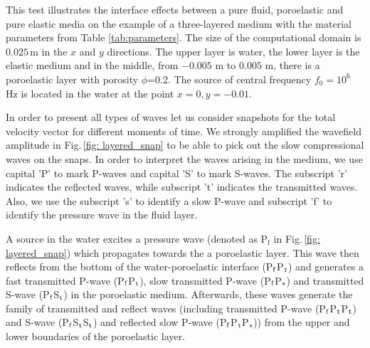 \documentclass[3p,times,table]{article}
\begin{document}
This test illustrates the interface effects between a pure fluid, poroelastic 
and 
pure elastic media on the example of a three-layered medium with the material 
parameters from Table 
\ref{tab:parameters}. The size of the computational domain is $0.025$\,m in the 
$ x $ and $ y $ directions. The upper layer is water, the lower layer is the
elastic 
medium and in the middle, from $-0.005$ m to $0.005$ m, there is a poroelastic 
layer with porosity $\phi$=0.2. The source of central frequency $f_0=10^{6}$ Hz 
is located in the water at the point $x=0, y=-0.01$. 

In order to present all types of waves let us consider snapshots  for the total 
velocity vector  for different moments of time. We strongly amplified the 
wavefield amplitude in Fig.\,\ref{fig: layered_snap} to be able to pick out the 
slow compressional waves on the snaps. In order to interpret the waves arising 
in the medium, we use capital 'P' to mark P-waves  and capital 'S' to 
mark S-waves. The subscript 'r'  indicates the reflected waves, while 
subscript 't'  indicates the transmitted waves. Also, we use the 
subscript 's' to identify a slow P-wave and subscript 'f' to identify the 
pressure wave in the fluid layer.

A source in the water excites a pressure wave (denoted as P$_\textrm{f}$ in 
Fig.\,\ref{fig: 
layered_snap}) which propagates towards the a poroelastic layer.
This wave then reflects from the bottom of the water-poroelastic interface 
(P$_\textrm f$P$_\textrm r$) and generates a fast transmitted P-wave 
(P$_\textrm f$P$_\textrm t$),  slow 
transmitted P-wave (P$_\textrm f$P$_\textrm s$) and transmitted 
S-wave (P$_\textrm f$S$_\textrm t$) in the  poroelastic medium. Afterwards, 
these waves generate the 
family of transmitted and reflect waves (including transmitted P-wave 
(P$_\textrm f$P$_\textrm t$P$_\textrm t$) and S-wave 
(P$_\textrm f$S$_\textrm t$S$_\textrm t$) and 
reflected slow P-wave (P$_\textrm f$P$_\textrm t$P$_\textrm s$)) from the  
upper and lower boundaries of 
the poroelastic layer. 
\end{document}
